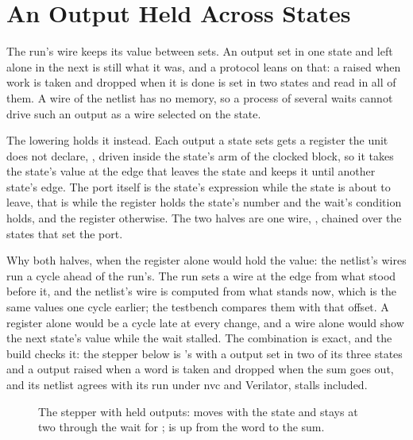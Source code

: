 \section{An Output Held Across States}
\label{sec:x-hold}

The run's wire keeps its value between sets. An output set in one
state and left alone in the next is still what it was, and a
protocol leans on that: a  raised when work is taken and
dropped when it is done is set in two states and read in all of
them. A wire of the netlist has no memory, so a process of several
waits cannot drive such an output as a wire selected on the state.

The lowering holds it instead. Each output a state sets gets a
register the unit does not declare, , driven
inside the state's arm of the clocked block, so it takes the state's
value at the edge that leaves the state and keeps it until another
state's edge. The port itself is the state's expression while the
state is about to leave, that is while the register holds the state's
number and the wait's condition holds, and the register otherwise.
The two halves are one wire, , chained
over the states that set the port.

Why both halves, when the register alone would hold the value: the
netlist's wires run a cycle ahead of the run's. The run sets a wire
at the edge from what stood before it, and the netlist's wire is
computed from what stands now, which is the same values one cycle
earlier; the testbench compares them with that offset. A register
alone would be a cycle late at every change, and a wire alone would
show the next state's value while the wait stalled. The combination
is exact, and the build checks it: the stepper below is
's with a  output set in two of its three
states and a  output raised when a word is taken and
dropped when the sum goes out, and its netlist agrees with its run
under nvc and Verilator, stalls included.

\begin{figure}[htbp]
\centering

\caption{The stepper with held outputs:  moves with the
state and stays at two through the wait for ; 
is up from the word to the sum.}
\label{fig:x-hold}
\end{figure}




